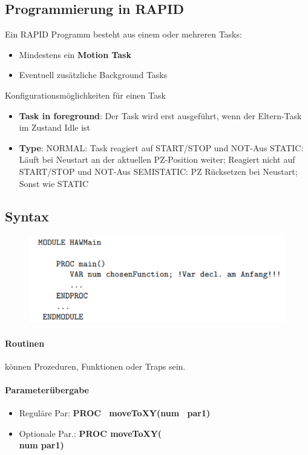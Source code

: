 \subsection{Programmierung in RAPID}
Ein RAPID Programm besteht aus einem oder mehreren Tasks:
\begin{itemize}
	\item Mindestens ein \textbf{Motion Task}
	\item Eventuell zusätzliche Background Tasks
\end{itemize}
Konfigurationsmöglichkeiten für einen Task
\begin{itemize}
	\item \textbf{Task in foreground}: Der Task wird erst ausgeführt, wenn der Eltern-Task im Zustand Idle ist
	\item \textbf{Type}:
	\subitem NORMAL: Task reagiert auf START/STOP und NOT-Aus
	\subitem STATIC: Läuft bei Neustart an der aktuellen PZ-Position weiter; Reagiert nicht auf START/STOP und NOT-Aus
	\subitem SEMISTATIC: PZ Rücksetzen bei Neustart; Sonst wie STATIC
\end{itemize}
\subsection{Syntax}
\begin{figure}[H]
	\begin{center}
		\includegraphics[scale=0.8]{Resources/PNG/Syntax1.PNG}
		\caption{}
		\label{fig:PNG/Syntax1.PNG}
	\end{center}
\end{figure}
\paragraph{Routinen}
können Prozeduren, Funktionen oder Traps sein.
\paragraph{Parameterübergabe}
\begin{itemize}
	\item Reguläre Par: \textbf{PROC \ moveToXY(num \ par1)}
	\item Optionale Par.: \textbf{PROC moveToXY(\\num par1)}
\end{itemize}
